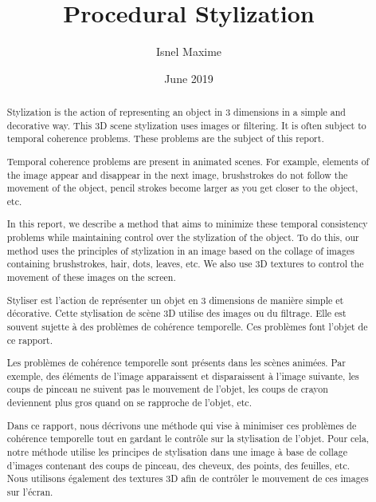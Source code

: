 \documentclass[12pt, a4paper]{memoir} %
\title{Procedural Stylization} %
\author{Isnel Maxime}
\date{June 2019} %
\begin{document}
\frontmatter
\begin{titlingpage}
\maketitle
\end{titlingpage}

\setlength{\parskip}{-1pt plus 1pt}

\renewcommand{\abstracttextfont}{\normalfont}
\abstractintoc
\begin{abstract}


Stylization is the action of representing an object in 3 dimensions in a simple and decorative way. This 3D scene stylization uses images or filtering. It is often subject to temporal coherence problems. These problems are the subject of this report.

Temporal coherence problems are present in animated scenes. For example, elements of the image appear and disappear in the next image, brushstrokes do not follow the movement of the object, pencil strokes become larger as you get closer to the object, etc.

In this report, we describe a method that aims to minimize these temporal consistency problems while maintaining control over the stylization of the object. To do this, our method uses the principles of stylization in an image based on the collage of images containing brushstrokes, hair, dots, leaves, etc. We also use 3D textures to control the movement of these images on the screen.

\end{abstract}
\abstractintoc



\renewcommand\abstractname{R\'esum\'e}
\begin{abstract} 

Styliser est l’action de représenter un objet en 3 dimensions de manière simple et décorative. Cette stylisation de scène 3D utilise des images ou du filtrage. Elle est souvent sujette à des problèmes de cohérence temporelle. Ces problèmes font l’objet de ce rapport. \newline

Les problèmes de cohérence temporelle sont présents dans les scènes animées. Par exemple, des éléments de l’image apparaissent et disparaissent à l’image suivante, les coups de pinceau ne suivent pas le mouvement de l’objet, les coups de crayon deviennent plus gros quand on se rapproche de l’objet, etc. \newline

Dans ce rapport, nous décrivons une méthode qui vise à minimiser ces problèmes de cohérence temporelle tout en gardant le contrôle sur la stylisation de l'objet. Pour cela, notre méthode utilise les principes de stylisation dans une image à base de collage d'images contenant des coups de pinceau, des cheveux, des points, des feuilles, etc. Nous utilisons également des textures 3D afin de contrôler le mouvement de ces images sur l'écran.

\end{abstract}
\end{document}

